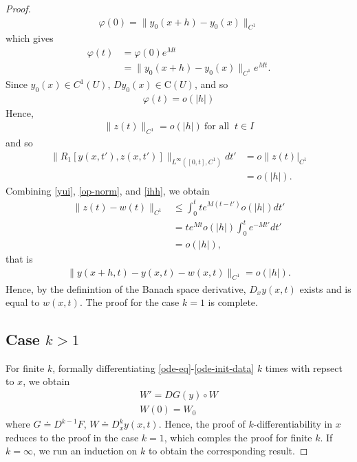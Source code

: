 \documentclass[12pt,reqno]{amsart}
\numberwithin{equation}{section}  %
\numberwithin{figure}{section}
\newcommand{\vp}{\varphi}
\theoremstyle{plain}
\theoremstyle{definition}
\theoremstyle{remark}
\begin{document}
\begin{proof}
\begin{gather*}
\vp(0) = \| y_{0}(x+h) - y_{0}(x) \|_{C^{1}}
\end{gather*}
%
%
which gives
%
%
\begin{equation*}
\begin{split}
  \vp(t) & = \vp(0)e^{Mt}
  \\
  & = \| y_{0}(x+h) - y_{0}(x) \|_{C^{1}} e^{Mt}.
\end{split}
\end{equation*}
%
%
Since $y_{0}(x) \in C^{1}(U)$, $Dy_{0}(x) \in \text{C}(U)$, and so
%
%
\begin{equation*}
\begin{split}
  \vp(t) = o(|h|)
\end{split}
\end{equation*}
%
%
Hence,
%
%
\begin{equation*}
\begin{split}
  \| z(t) \|_{C^{1}}  =  o (| h | ) \ \text{for all } \ t \in I
\end{split}
\end{equation*}
%
%
and so
%
\begin{equation}
  \begin{split}
    \label{ihh}
    \| R_{1}\left[ y(x,t'), z(x,t')
    \right] \|_{L^{\infty}\left( [0,t], C^{1} \right)} dt' 
    & = o\| z(t) |_{C^{1}} 
    \\
    & = o(| h |).
  \end{split}
\end{equation}
%
%
%
Combining \eqref{yui}, \eqref{op-norm}, and \eqref{ihh}, we obtain
%
%
\begin{equation*}
\begin{split}
  \| z(t) - w(t) \|_{C^{1}} 
  & \le \int_{0}^{t} t e^{M(t - t')} o(| h
  |) dt'
  \\
  & = te^{Mt} o(| h |) \int_{0}^{t} e^{-Mt'} dt'
  \\
  & = o(| h |),
\end{split}
\end{equation*}
%
%
that is
%
%
\begin{equation*}
\begin{split}
  \| y(x + h, t) - y(x,t) - w(x,t) \|_{C^{1}} = o(| h |).
\end{split}
\end{equation*}
%
%
Hence, by the definintion of the Banach space derivative, $D_{x}y(x,t)$ exists and
is equal to $w(x,t)$. The proof for the case $k=1$ is complete.
\subsection{Case $k >1$} 
\label{ssec:case-kg1}
For finite $k$, formally differentiating \eqref{ode-eq}-\eqref{ode-init-data}
$k$ times with repsect to $x$, we obtain
\begin{gather*}
  W' = DG(y) \circ W
  \\
  W(0) = W_{0}
\end{gather*}
where $G \doteq D^{k-1}F$, $W \doteq D_{x}^{k} y(x,t)$. Hence, the proof of
$k$-\time differentiability in $x$ reduces to the proof in the case $k=1$, which
comples the proof for finite $k$. If $k = \infty$, we run an induction on $k$ to
obtain the corresponding result.
\end{proof}
\end{document}
